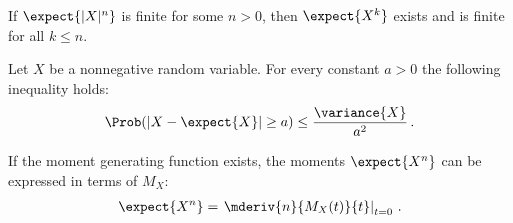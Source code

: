     \begin{property}
        If $\expect{|X|^n}$ is finite for some $n>0$, then $\expect{X^k}$ exists and is finite for all $k\leq n$.
    \end{property}

    \begin{property}
        Let $X$ be a nonnegative random variable. For every constant $a>0$ the following inequality holds:
        \begin{gather}
            \Prob(|X-\expect{X}|\geq a)\leq\frac{\variance{X}}{a^2}\,.
        \end{gather}
    \end{property}

    \begin{property}
        If the moment generating function exists, the moments $\expect{X^n}$ can be expressed in terms of $M_X$:
        \begin{gather}
            \label{prob:moment_generating}
            \expect{X^n} = \left.\mderiv{n}{M_X(t)}{t}\right|_{t=0}\,.
        \end{gather}
    \end{property}


